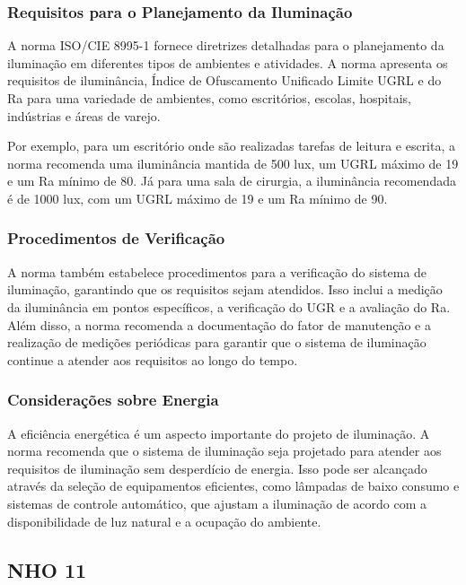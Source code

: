 \subsubsection{Requisitos para o Planejamento da Iluminação}

A norma ISO/CIE 8995-1 fornece diretrizes detalhadas para o planejamento da iluminação em diferentes tipos de ambientes e atividades. A norma apresenta os requisitos de iluminância, Índice de Ofuscamento Unificado Limite \gls{UGRL} e do \gls{Ra} para uma variedade de ambientes, como escritórios, escolas, hospitais, indústrias e áreas de varejo.

Por exemplo, para um escritório onde são realizadas tarefas de leitura e escrita, a norma recomenda uma iluminância mantida de 500 \gls{lux}, um \gls{UGRL} máximo de 19 e um \gls{Ra} mínimo de 80. Já para uma sala de cirurgia, a iluminância recomendada é de 1000 \gls{lux}, com um \gls{UGRL} máximo de 19 e um \gls{Ra} mínimo de 90.

\subsubsection{Procedimentos de Verificação}

A norma também estabelece procedimentos para a verificação do sistema de iluminação, garantindo que os requisitos sejam atendidos. Isso inclui a medição da iluminância em pontos específicos, a verificação do \gls{UGR} e a avaliação do \gls{Ra}. Além disso, a norma recomenda a documentação do fator de manutenção e a realização de medições periódicas para garantir que o sistema de iluminação continue a atender aos requisitos ao longo do tempo.

\subsubsection{Considerações sobre Energia}

A eficiência energética é um aspecto importante do projeto de iluminação. A norma recomenda que o sistema de iluminação seja projetado para atender aos requisitos de iluminação sem desperdício de energia. Isso pode ser alcançado através da seleção de equipamentos eficientes, como lâmpadas de baixo consumo e sistemas de controle automático, que ajustam a iluminação de acordo com a disponibilidade de luz natural e a ocupação do ambiente.


\subsection{NHO 11}

